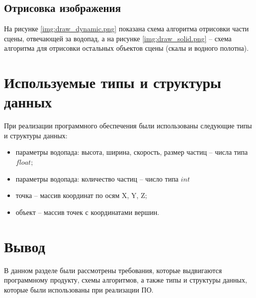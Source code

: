 

\subsection{Отрисовка изображения}

На рисунке \ref{img:draw_dynamic.png} показана схема алгоритма отрисовки части сцены, отвечающей за водопад, а на рисунке \ref{img:draw_solid.png} -- схема алгоритма для отрисовки остальных объектов сцены (скалы и водного полотна).


\clearpage

\section{Используемые типы и структуры данных}

При реализации программного обеспечения были использованы следующие типы и структуры данных:

\begin{itemize}
    \item параметры водопада: высота, ширина, скорость, размер частиц -- числа типа $float$;
    \item параметры водопада: количество частиц -- число типа $int$
    \item точка -- массив координат по осям X, Y, Z;
    \item объект -- массив точек с координатами вершин.
\end{itemize}


\section*{Вывод}

В данном разделе были рассмотрены требования, которые выдвигаются программному продукту, схемы алгоритмов, а также типы и структуры данных, которые были использованы при реализации ПО. 
